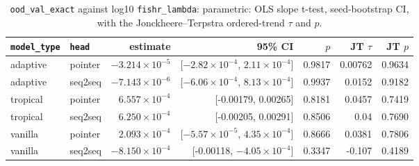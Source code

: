 \documentclass[10pt]{article}
\begin{document}
{\small
\begin{longtable}{llrrrrr}
\caption{\texttt{ood\_val\_exact} against log10 \texttt{fishr\_lambda}: parametric: OLS slope t-test, seed-bootstrap CI, with the Jonckheere--Terpstra ordered-trend $\tau$ and $p$.}\label{tab:trend-ood_val_exact}\\
\toprule
\texttt{model\_type} & \texttt{head} & estimate & 95\% CI & $p$ & JT $\tau$ & JT $p$\\
\midrule
\endhead
adaptive & pointer & $-3.214\times10^{-5}$ & [$-2.82\times10^{-4}$, $2.11\times10^{-4}$] & 0.9817 & 0.00762 & 0.9634\\
adaptive & seq2seq & $-7.143\times10^{-6}$ & [$-6.06\times10^{-4}$, $8.13\times10^{-4}$] & 0.9937 & 0.0152 & 0.9182\\
tropical & pointer & $6.557\times10^{-4}$ & [-0.00179, 0.00265] & 0.8181 & 0.0457 & 0.7419\\
tropical & seq2seq & $6.250\times10^{-4}$ & [-0.00205, 0.00291] & 0.8506 & 0.04 & 0.7690\\
vanilla & pointer & $2.093\times10^{-4}$ & [$-5.57\times10^{-5}$, $4.35\times10^{-4}$] & 0.8666 & 0.0381 & 0.7806\\
vanilla & seq2seq & $-8.150\times10^{-4}$ & [-0.00118, $-4.05\times10^{-4}$] & 0.3347 & -0.107 & 0.4189\\
\bottomrule
\end{longtable}
}
\end{document}
